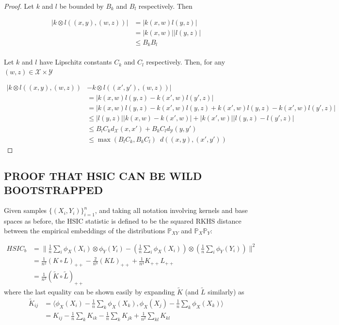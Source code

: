 \documentclass[]{article}
\begin{document}
\begin{proof} Let $k$ and $l$ be bounded by $B_k$ and $B_l$ respectively. Then 

\begin{align*}
|k \otimes l \left( (x,y), (w,z) \right)| &= |k(x,w)l(y,z)| \\
&= |k(x,w)||l(y,z)| \\
&\leq B_k B_l \\
\end{align*}

Let $k$ and $l$ have Lipschitz constants $C_k$ and $C_l$ respectively. Then, for any $(w,z) \in \mathcal{X\times Y}$

\begin{align*}
|k \otimes l \left( (x,y), (w,z) \right) &- k \otimes l \left( (x',y'), (w,z) \right) |  \\
& = |k(x,w)l(y,z) - k(x',w)l(y',z)| \\
& = |k(x,w)l(y,z) - k(x',w)l(y,z) + k(x',w)l(y,z) - k(x',w)l(y',z)| \\
& \leq |l(y,z)| |k(x,w) - k(x',w)| + |k(x',w)||l(y,z) - l(y',z)| \\
& \leq B_l C_k d_\mathcal{X}(x,x') + B_k C_l d_\mathcal{Y}(y,y') \\
& \leq \max(B_l C_k, B_k C_l )  \enspace d\left((x,y),(x',y')\right) 
\end{align*}

\end{proof}

\subsection{PROOF THAT HSIC CAN BE WILD BOOTSTRAPPED}

Given samples $\{(X_i,Y_i)\}_{i=1}^n$, and taking all notation involving kernels and base spaces as before, the HSIC statistic is defined to be the squared RKHS distance between the empirical embeddings of the distributions $\mathbb{P}_{XY}$ and $\mathbb{P}_X\mathbb{P}_Y$:

\begin{align*}
HSIC_b & = \| \frac{1}{n}\sum_i \phi_X(X_i) \otimes \phi_Y(Y_i) - \left(\frac{1}{n}\sum_i \phi_X(X_i)\right) \otimes \left(\frac{1}{n}\sum_i \phi_Y(Y_i) \right)\|^2 \\
& = \frac{1}{n^2} (K\circ L)_{++}  - \frac{2}{n^3}(KL)_{++} + \frac{1}{n^4}K_{++}L_{++} \\
& = \frac{1}{n^2}(\tilde{K}\circ \tilde{L})_{++}
\end{align*}
where the last equality can be shown easily by expanding $\tilde{K}$ (and $\tilde{L}$ similarly) as
\begin{align*}
\tilde{K}_{ij} &= \langle\phi_X(X_i)- \frac{1}{n}\sum_k\phi_X(X_k),\phi_X(X_j) - \frac{1}{n}\sum_k\phi_X(X_k)\rangle \\
&= K_{ij} - \frac{1}{n}\sum_kK_{ik} - \frac{1}{n}\sum_kK_{jk} + \frac{1}{n^2}\sum_{kl}K_{kl}
\end{align*} 
\end{document}
